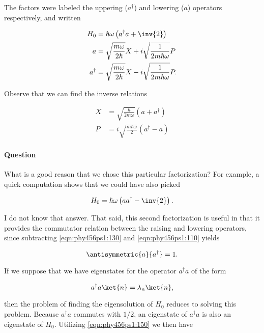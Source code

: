 The factors were labeled the uppering ($a^\dagger$) and lowering ($a$) operators respectively, and written

\begin{align}\label{eqn:phy456ps1:110}
H_0 &= \hbar \omega \left( a^\dagger a + \inv{2} \right) \\
a &= \sqrt{\frac{m \omega}{2 \hbar}} X + i \sqrt{\frac{1}{2m \hbar \omega}} P \\
a^\dagger &= \sqrt{\frac{m \omega}{2 \hbar}} X - i \sqrt{\frac{1}{2m \hbar \omega}} P.
\end{align}

Observe that we can find the inverse relations

\begin{align}\label{eqn:phy456ps1:115}
X &= \sqrt{ \frac{\hbar}{2 m \omega} } \left( a + a^\dagger \right) \\
P &= i \sqrt{ \frac{m \hbar \omega}{2} } \left( a^\dagger  - a \right)
\end{align}

\paragraph{Question}
What is a good reason that we chose this particular factorization?  For example, a quick computation shows that we could have also picked

\begin{equation}\label{eqn:phy456ps1:130}
H_0 = \hbar \omega \left( a a^\dagger - \inv{2} \right).
\end{equation}

I do not know that answer.  That said, this second factorization is useful in that it provides the commutator relation between the raising and lowering operators, since subtracting \ref{eqn:phy456ps1:130} and \ref{eqn:phy456ps1:110} yields

\begin{equation}\label{eqn:phy456ps1:150}
\antisymmetric{a}{a^\dagger} = 1.
\end{equation}

If we suppose that we have eigenstates for the operator $a^\dagger a$ of the form

\begin{equation}\label{eqn:phy456ps1:200}
a^\dagger a \ket{n} = \lambda_n \ket{n},
\end{equation}

then the problem of finding the eigensolution of $H_0$ reduces to solving this problem.  Because $a^\dagger a$ commutes with $1/2$, an eigenstate of $a^\dagger a$ is also an eigenstate of $H_0$.  Utilizing \ref{eqn:phy456ps1:150} we then have

